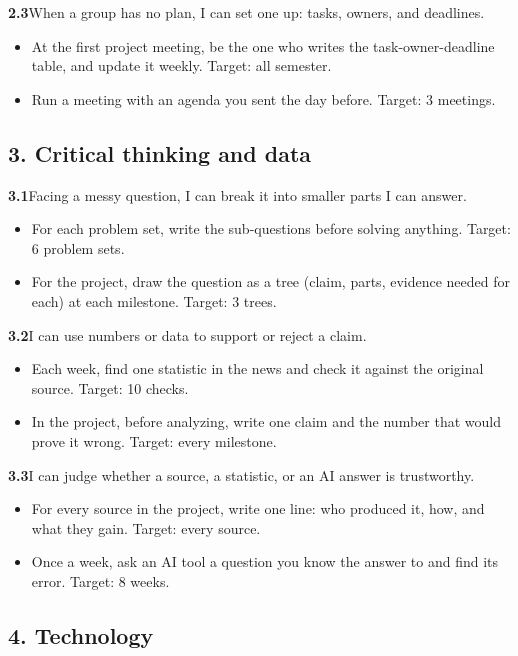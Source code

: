 \documentclass[11pt,letterpaper]{article}
\newcommand{\bx}{$\square$}
\newcommand{\itemhead}[2]{\par\vspace{6pt}\noindent\textbf{#1}\quad #2\par\vspace{-4pt}}
\newenvironment{practices}{\begin{itemize}[leftmargin=2.2em,itemsep=1pt,topsep=2pt,label=\bx]}{\end{itemize}}
\begin{document}
\itemhead{2.3}{When a group has no plan, I can set one up: tasks, owners, and deadlines.}
\begin{practices}
\item At the first project meeting, be the one who writes the task-owner-deadline table, and update it weekly. Target: all semester.
\item Run a meeting with an agenda you sent the day before. Target: 3 meetings.
\end{practices}

\subsection*{3. Critical thinking and data}

\itemhead{3.1}{Facing a messy question, I can break it into smaller parts I can answer.}
\begin{practices}
\item For each problem set, write the sub-questions before solving anything. Target: 6 problem sets.
\item For the project, draw the question as a tree (claim, parts, evidence needed for each) at each milestone. Target: 3 trees.
\end{practices}

\itemhead{3.2}{I can use numbers or data to support or reject a claim.}
\begin{practices}
\item Each week, find one statistic in the news and check it against the original source. Target: 10 checks.
\item In the project, before analyzing, write one claim and the number that would prove it wrong. Target: every milestone.
\end{practices}

\itemhead{3.3}{I can judge whether a source, a statistic, or an AI answer is trustworthy.}
\begin{practices}
\item For every source in the project, write one line: who produced it, how, and what they gain. Target: every source.
\item Once a week, ask an AI tool a question you know the answer to and find its error. Target: 8 weeks.
\end{practices}

\subsection*{4. Technology}
\end{document}
